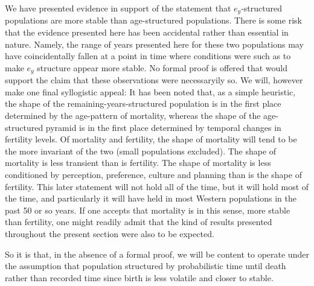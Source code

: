 We have presented evidence in support of the statement that $e_y$-structured
populations are more stable than age-structured populations. There is some
risk that the evidence presented here has been accidental rather
than essential in nature. Namely, the range of years presented here for these
two populations may have coincidentally fallen at a point in time where
conditions were such as to make $e_y$ structure appear more stable. No formal
proof is offered that would support the claim that these observations were
necessaryily so. We will, however make one final syllogistic appeal: It has been
noted that, as a simple heuristic, the shape of the remaining-years-structured
population is in the first place determined by the age-pattern of mortality,
whereas the shape of the age-structured pyramid is in the first place
determined by temporal changes in fertility levels. Of mortality and
fertility, the shape of mortality will tend to be the more invariant of the two
(small populations excluded). The shape of mortality is less transient than is
fertility. The shape of mortality is less conditioned by perception, preference, 
culture and planning than is the shape of fertility. This later statement will
not hold all of the time, but it will hold most of the time, and particularly it
will have held in most Western populations in the past 50 or so years. If one
accepts that mortality is in this sense, more stable than fertility, one might
readily admit that the kind of results presented throughout the present section
were also to be expected. 

So it is that, in the absence of a formal proof, we
will be content to operate under the assumption that population structured by 
probabilistic time until death rather than recorded time since birth is less
volatile and closer to stable.






 \FloatBarrier




